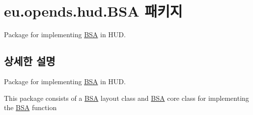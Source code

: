 \hypertarget{namespaceeu_1_1opends_1_1hud_1_1_b_s_a}{}\section{eu.\+opends.\+hud.\+B\+S\+A 패키지}
\label{namespaceeu_1_1opends_1_1hud_1_1_b_s_a}


Package for implementing \hyperlink{namespaceeu_1_1opends_1_1hud_1_1_b_s_a}{B\+S\+A} in H\+U\+D.  




\subsection{상세한 설명}
Package for implementing \hyperlink{namespaceeu_1_1opends_1_1hud_1_1_b_s_a}{B\+S\+A} in H\+U\+D. 

This package consists of a \hyperlink{namespaceeu_1_1opends_1_1hud_1_1_b_s_a}{B\+S\+A} layout class and \hyperlink{namespaceeu_1_1opends_1_1hud_1_1_b_s_a}{B\+S\+A} core class for implementing the \hyperlink{namespaceeu_1_1opends_1_1hud_1_1_b_s_a}{B\+S\+A} function 